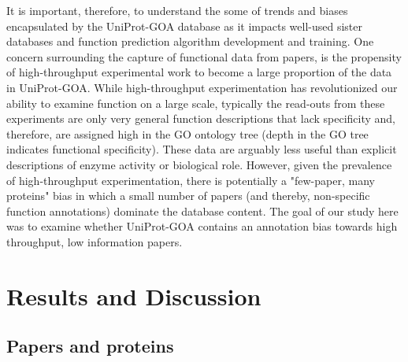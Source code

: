 \documentclass[10pt]{bmc_article}
\newenvironment{bmcformat}{\begin{raggedright}\baselineskip20pt\sloppy\setboolean{publ}{false}}{\end{raggedright}\baselineskip20pt\sloppy}
\begin{document}
\begin{bmcformat}
It is important, therefore, to understand the some of trends and biases
encapsulated by the UniProt-GOA database as it impacts well-used sister
databases and function prediction algorithm development and training. One
concern surrounding the capture of functional data from papers, is the
propensity of high-throughput experimental work to become a large proportion of
the data in UniProt-GOA. While high-throughput experimentation has
revolutionized our ability to examine function on a large scale, typically the
read-outs from these experiments are only very general function descriptions
that lack specificity and, therefore, are assigned high in the GO ontology tree
(depth in the GO tree indicates functional specificity). These data are
arguably less useful than explicit descriptions of enzyme activity or
biological role. However, given the prevalence of high-throughput
experimentation, there is potentially a "few-paper, many proteins" bias in
which a small number of papers (and thereby, non-specific function annotations)
dominate the database content. The goal of our study here was to examine
whether UniProt-GOA contains an annotation bias towards high throughput, low
information papers. 

 
\section*{Results and Discussion}
  \subsection*{Papers and proteins}


\end{bmcformat}
\end{document}
